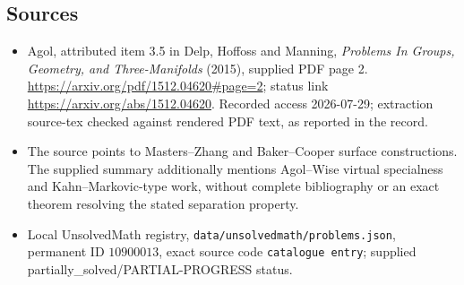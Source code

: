 \documentclass[11pt]{article}
\begin{document}
\subsection{Sources}
\begin{itemize}
\item Agol, attributed item 3.5 in Delp, Hoffoss and Manning, \emph{Problems In Groups, Geometry, and Three-Manifolds} (2015), supplied PDF page 2. \url{https://arxiv.org/pdf/1512.04620#page=2}; status link \url{https://arxiv.org/abs/1512.04620}. Recorded access 2026-07-29; extraction source-tex checked against rendered PDF text, as reported in the record.
\item The source points to Masters--Zhang and Baker--Cooper surface constructions. The supplied summary additionally mentions Agol--Wise virtual specialness and Kahn--Markovic-type work, without complete bibliography or an exact theorem resolving the stated separation property.
\item Local UnsolvedMath registry, \texttt{data/unsolvedmath/problems.json}, permanent ID \(10900013\), exact source code \texttt{catalogue entry}; supplied partially\_solved/PARTIAL-PROGRESS status.
\end{itemize}
\end{document}
